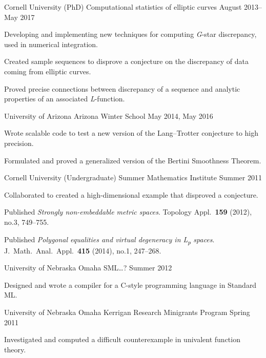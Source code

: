 \documentclass[11pt, letterpaper]{awesome-cv}
\begin{document}

\begin{cventries}

\cventry
	{Cornell University (PhD)}
	{Computational statistics of elliptic curves}
	{}
	{August 2013--May 2017}
	{
		\begin{cvitems}
			\item{Developing and implementing new techniques for computing \emph{G}-star discrepancy, used in numerical integration.}
			\item{Created sample sequences to disprove a conjecture on the discrepancy of data coming from elliptic curves.}
			\item{Proved precise connections between discrepancy of a sequence and analytic properties of an associated \emph{L}-function.}
		\end{cvitems}
	}
		
\cventry
	{University of Arizona}
	{Arizona Winter School}
	{}
	{May 2014, May 2016}
	{
		\begin{cvitems}
			\item{Wrote scalable code to test a new version of the Lang--Trotter conjecture to high precision.}
			\item{Formulated and proved a generalized version of the Bertini Smoothness Theorem.}
		\end{cvitems}
	}
	
\cventry
	{Cornell University (Undergraduate)}
	{Summer Mathematics Institute}
	{}
	{Summer 2011}
	{
		\begin{cvitems}
			\item{Collaborated to created a high-dimensional example that disproved a conjecture.}
			\item{Published \emph{Strongly non-embeddable metric spaces}. Topology Appl.~\textbf{159} (2012), no.3, 749--755.}
			\item{Published \emph{Polygonal equalities and virtual degeneracy in L\textsubscript{p} spaces}. J.~Math.~Anal.~Appl.~\textbf{415} (2014), no.1, 247--268.}
		\end{cvitems}
	}
	
\cventry
	{University of Nebraska Omaha}
	{SML\ldots ?}
	{}
	{Summer 2012}
	{
		\begin{cvitems}
			\item{Designed and wrote a compiler for a C-style programming language in Standard ML.}
		\end{cvitems}
	}
	
\cventry
	{University of Nebraska Omaha}
	{Kerrigan Research Minigrants Program}
	{}
	{Spring 2011}
	{
		\begin{cvitems}
			\item{Investigated and computed a difficult counterexample in univalent function theory.}
		\end{cvitems}
	}
	

\end{cventries}
\end{document}
